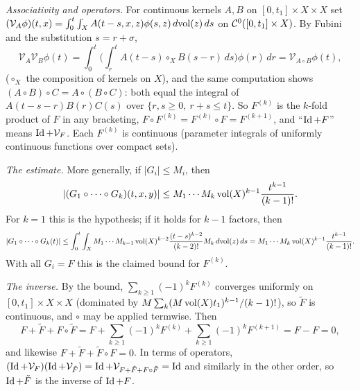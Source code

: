 \emph{Associativity and operators.} For continuous kernels $A,B$ on $[0,t_1]\times X\times X$ set
$(\mathcal V_A\phi)(t,x)=\int_0^t\int_XA(t-s,x,z)\phi(s,z)\,d\mathrm{vol}(z)\,ds$ on $\mathcal{C}^0([0,t_1]\times X)$. By
Fubini and the substitution $s=r+\sigma$,
\begin{equation*}
  \mathcal V_A\mathcal V_B\phi(t)=\int_0^t\Big(\int_r^tA(t-s)\circ_XB(s-r)\,ds\Big)\phi(r)\,dr
  =\mathcal V_{A\circ B}\phi(t),
\end{equation*}
($\circ_X$ the composition of kernels on $X$), and the same computation shows
$(A\circ B)\circ C=A\circ(B\circ C)$: both equal the integral of
$A(t-s-r)B(r)C(s)$ over $\{r,s\ge0,\ r+s\le t\}$. So $F^{(k)}$ is the $k$-fold product of $F$ in any
bracketing, $F\circ F^{(k)}=F^{(k)}\circ F=F^{(k+1)}$, and ``$\operatorname{Id}+F$'' means $\operatorname{Id}+\mathcal V_F$.
Each $F^{(k)}$ is continuous (parameter integrals of uniformly continuous functions over compact sets).

\emph{The estimate.} More generally, if $|G_i|\le M_i$, then
\begin{equation}\label{solwave:eq:volterra}
  |(G_1\circ\dots\circ G_k)(t,x,y)|\le M_1\cdots M_k\operatorname{vol}(X)^{k-1}\frac{t^{k-1}}{(k-1)!}.
\end{equation}
For $k=1$ this is the hypothesis; if it holds for $k-1$ factors, then
\begin{equation*}
  |G_1\circ\dots\circ G_k(t)|\le\int_0^t\int_XM_1\cdots M_{k-1}\operatorname{vol}(X)^{k-2}\frac{(t-s)^{k-2}}{(k-2)!}M_k\,d\mathrm{vol}(z)\,ds
  =M_1\cdots M_k\operatorname{vol}(X)^{k-1}\frac{t^{k-1}}{(k-1)!}.
\end{equation*}
With all $G_i=F$ this is the claimed bound for $F^{(k)}$.

\emph{The inverse.} By the bound, $\sum_{k\ge1}(-1)^kF^{(k)}$ converges uniformly on
$[0,t_1]\times X\times X$ (dominated by $M\sum_k(M\operatorname{vol}(X)t_1)^{k-1}/(k-1)!$), so $\tilde F$ is
continuous, and $\circ$ may be applied termwise. Then
\begin{equation*}
  F+\tilde F+F\circ\tilde F=F+\sum_{k\ge1}(-1)^kF^{(k)}+\sum_{k\ge1}(-1)^kF^{(k+1)}=F-F=0,
\end{equation*}
and likewise $F+\tilde F+\tilde F\circ F=0$. In terms of operators,
$(\operatorname{Id}+\mathcal V_F)(\operatorname{Id}+\mathcal V_{\tilde F})=\operatorname{Id}+\mathcal V_{F+\tilde F+F\circ\tilde F}=\operatorname{Id}$ and
similarly in the other order, so $\operatorname{Id}+\tilde F$ is the inverse of $\operatorname{Id}+F$.

